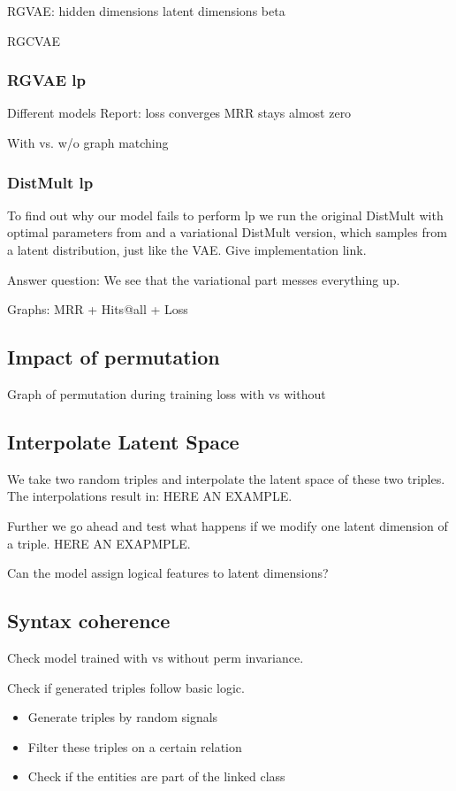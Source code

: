 RGVAE:
hidden dimensions
latent dimensions
beta


RGCVAE

\subsubsection{RGVAE lp}
Different models
Report:
loss converges
MRR stays almost zero

With vs. w/o graph matching


\subsubsection{DistMult lp}
To find out why our model fails to perform lp we run the original DistMult with optimal parameters from \cite{ruffinelli_you_2019} and a variational DistMult version, which samples from a latent distribution, just like the VAE. Give implementation link.

Answer question:
We see that the variational part messes everything up.

Graphs:
MRR + Hits@all + Loss

\subsection{Impact of permutation}

Graph of permutation during training
loss with vs without 

\subsection{Interpolate Latent Space}
We take two random triples and interpolate the latent space of these two triples. The interpolations result in: HERE AN EXAMPLE.

Further we go ahead and test what happens if we modify one latent dimension of a triple. HERE AN EXAPMPLE.

Can the model assign logical features to latent dimensions?


\subsection{Syntax coherence}

Check model trained with vs without perm invariance.

Check if generated triples follow basic logic.
\begin{itemize}
    \item Generate triples by random signals
    \item Filter these triples on a certain relation
    \item Check if the entities are part of the linked class
\end{itemize}

